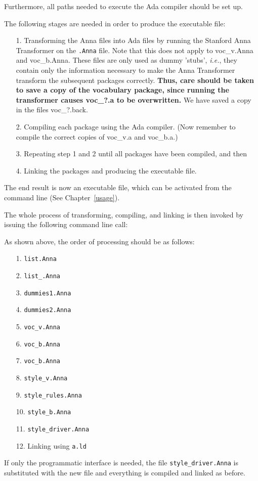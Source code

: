 Furthermore, all paths needed to execute the Ada compiler should be set up.

The following stages are needed in order to produce the executable file:

\begin{itemize}
\item [1.] Transforming the Anna files into Ada files by running the
 Stanford Anna Transformer on the {\tt .Anna} file. Note that this does not
apply to voc\_v.Anna and voc\_b.Anna. These files are only used as dummy 'stubs',
{\em i.e.}, they contain only the information necessary to make the Anna Transformer
transform the subsequent packages correctly. {\bf Thus, care should be taken to
save a copy of the vocabulary package, since running the transformer causes
voc\_?.a to be overwritten.} We have saved a copy in the files voc\_?.back.

\item [2.] Compiling each package using the Ada compiler. (Now remember to
compile the correct copies of voc\_v.a and voc\_b.a.)
\item [3.] Repeating step 1 and 2 until all packages have been compiled,
and then
\item [4.] Linking the packages and producing the executable file.
\end{itemize}

The end result is now an executable file, which can be activated from the
command line (See Chapter~\ref{usage}).

The whole process of transforming, compiling, and linking is then invoked by
issuing the following command line call:

{}

As shown above, the order of processing should be as follows:

\begin{itemize}
\item [1.] {\tt list.Anna}
\item [2.] {\tt list\_.Anna}
\item [3.] {\tt dummies1.Anna}
\item [4.] {\tt dummies2.Anna}
\item [5.] {\tt voc\_v.Anna}
\item [6.] {\tt voc\_b.Anna}
\item [7.] {\tt voc\_b.Anna}
\item [8.] {\tt style\_v.Anna}
\item [9.] {\tt style\_rules.Anna}
\item [10.] {\tt style\_b.Anna}
\item [11.] {\tt style\_driver.Anna}
\item [12.] Linking using {\tt a.ld}
\end{itemize}

If only the programmatic interface is needed, the file {\tt style\_driver.Anna}
is substituted with the new file and everything is compiled and linked
as before.
